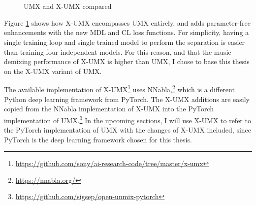 \documentclass[report.tex]{subfiles}
\begin{document}
\begin{figure}[ht]
	\centering
	\\
	\\
	\caption{UMX and X-UMX compared}
	\label{fig:umxandxumx}
\end{figure}

Figure \ref{fig:umxandxumx} shows how X-UMX encompasses UMX entirely, and adds parameter-free enhancements with the new MDL and CL loss functions. For simplicity, having a single training loop and single trained model to perform the separation is easier than training four independent models. For this reason, and that the music demixing performance of X-UMX is higher than UMX, I chose to base this thesis on the X-UMX variant of UMX.

The available implementation of X-UMX\footnote{\url{https://github.com/sony/ai-research-code/tree/master/x-umx}} uses NNabla,\footnote{\url{https://nnabla.org/}} which is a different Python deep learning framework from PyTorch. The X-UMX additions are easily copied from the NNabla implementation of X-UMX into the PyTorch implementation of UMX.\footnote{\url{https://github.com/sigsep/open-unmix-pytorch}} In the upcoming sections, I will use X-UMX to refer to the PyTorch implementation of UMX with the changes of X-UMX included, since PyTorch is the deep learning framework chosen for this thesis.
\end{document}
